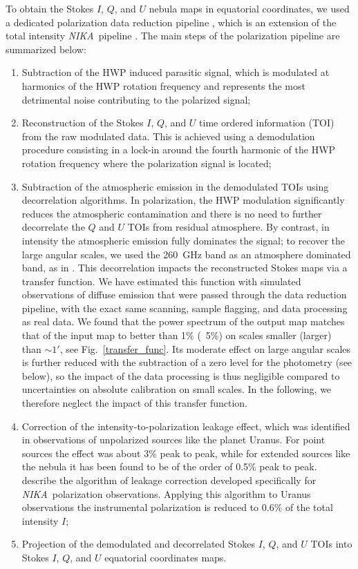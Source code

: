 \documentclass[twocolumn,traditabstract]{aa}
\def\NIKA{\textit{NIKA}}
\begin{document}
To obtain the Stokes $I$, $Q$, and $U$  nebula maps in  equatorial coordinates, we  used a dedicated
polarization data reduction pipeline \citep{ritacco2017}, which is an extension
of the total intensity \NIKA\ pipeline \citep{catalano2014,adam2013}. The main steps
of the polarization pipeline are summarized below:
\begin{enumerate}
\item Subtraction of the HWP induced parasitic signal, which is modulated at harmonics of the HWP rotation frequency and represents the most detrimental noise contributing to the polarized signal; 
\item Reconstruction of the Stokes $I$, $Q$, and $U$ time ordered information
  (TOI) from the raw modulated data. This is achieved using a demodulation
  procedure consisting in a lock-in around the fourth harmonic of the HWP rotation frequency where the polarization signal is located;
\item Subtraction of the atmospheric emission in the demodulated TOIs using
  decorrelation algorithms. In polarization, the HWP modulation 
  significantly reduces the atmospheric contamination and there is no need to
  further decorrelate the $Q$ and $U$ TOIs from residual atmosphere. By contrast, in
  intensity the atmospheric emission fully dominates the signal; to recover
  the large angular scales, we used the 260~GHz band as an atmosphere
  dominated band, as in \cite{adam2013}.  This decorrelation impacts the  reconstructed Stokes maps via a transfer function. We have estimated this function
  with simulated observations of diffuse emission that were passed through the
  data reduction pipeline, with the exact same scanning, sample flagging, and data
  processing as real data. We found that the power spectrum of the output map
  matches that of the input map to better than 1\% (~5\%) on scales smaller  (larger) than $\sim 1'$, see Fig.~\ref{transfer_func}. Its moderate effect on large angular scales is further reduced with the subtraction of a zero level for the photometry (see below), so the impact of the data processing is thus
  negligible compared to uncertainties on absolute calibration on small
  scales. In the
  following, we therefore neglect the impact of this transfer function.


\item Correction of the intensity-to-polarization leakage effect, which was
  identified in observations of unpolarized sources like the planet Uranus. For
  point sources the effect was about 3\% peak to peak, while for extended sources like the  nebula it has been found to be of the order of 0.5\% peak to peak. 
  \cite{ritacco2017} describe the algorithm of leakage correction developed specifically for \NIKA\ polarization observations. Applying this algorithm to Uranus observations the instrumental polarization is reduced to 0.6\% of the total intensity $I$;
  \item Projection of the demodulated and decorrelated Stokes $I$, $Q$, and $U$ TOIs into Stokes $I$, $Q$, and $U$ equatorial coordinates maps.

\end{enumerate}
\end{document}
